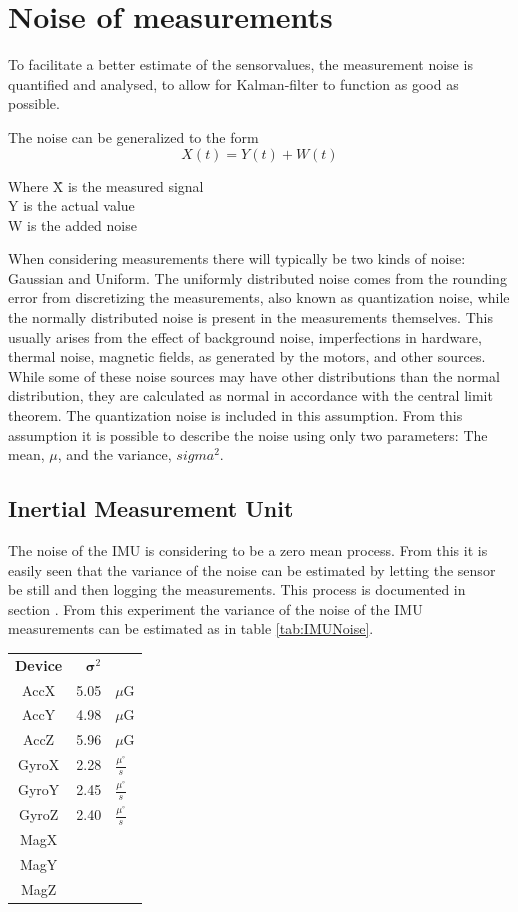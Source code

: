 \chapter{Noise of measurements}
To facilitate a better estimate of the sensorvalues, the measurement noise is quantified and analysed, to allow for Kalman-filter to function as good as possible.

The noise can be generalized to the form
\begin{equation}
X(t) = Y(t) + W(t)
\end{equation}
\begin{tabbing}
Where \= X is the measured signal\\
	\> Y is the actual value\\
	\> W is the added noise 
\end{tabbing}
When considering measurements there will typically be two kinds of noise: Gaussian and Uniform. The uniformly distributed noise comes from the rounding error from discretizing the measurements, also known as quantization noise, while the normally distributed noise is present in the measurements themselves. This usually arises from the effect of background noise, imperfections in hardware, thermal noise, magnetic fields, as generated by the motors, and other sources. While some of these noise sources may have other distributions than the normal distribution, they are calculated as normal in accordance with the central limit theorem. The quantization noise is included in this assumption. From this assumption it is possible to describe the noise using only two parameters: The mean, $\mu$, and the variance, $sigma^{2}$.

\section{Inertial Measurement Unit}
The noise of the IMU is considering to be a zero mean process. From this it is easily seen that the variance of the noise can be estimated by letting the sensor be still and then logging the measurements. This process is documented in section . From this experiment the variance of the noise of the IMU measurements can be estimated as in table \ref{tab:IMUNoise}.

\begin{table}
\begin{tabular}{c|r l}
\textbf{Device} & $\boldsymbol\sigma ^2$ &\\
AccX & 5.05 & $\mu$G \\
AccY & 4.98 & $\mu$G \\
AccZ & 5.96 & $\mu$G \\
GyroX & 2.28 & $\frac{\mu ^\circ}{s}$\\
GyroY & 2.45 & $\frac{\mu ^\circ}{s}$\\
GyroZ & 2.40 & $\frac{\mu ^\circ}{s}$\\
MagX & & \\
MagY & & \\
MagZ & &\\
\end{tabular}
\end{table}
\label{tab:IMUNoise}

